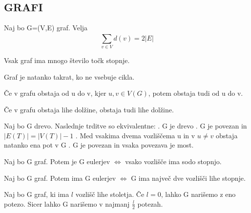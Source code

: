\subsection{GRAFI}
\begin{frame}
    \subsectionpage
\end{frame}

\begin{slajd}
    {}{Naj bo G=(V,E) graf. Velja \[\sum_{v \in V}^{} d(v) = 2|E|\]}
\end{slajd}

\begin{pagin}
Vsak graf ima  mnogo število točk  stopnje.
\end{pagin}

\begin{pagin}
Graf je  natanko takrat, ko ne vsebuje  cikla.
\end{pagin}

\begin{pagin}
Če v grafu obstaja  od u do v, kjer $u,v \in V(G)$, potem obstaja tudi  od u do v.
\end{pagin}

\begin{pagin}
    Če v grafu obstaja  lihe dolžine, obstaja tudi  lihe dolžine.
\end{pagin}

\begin{slajd}
    {}{Naj bo G drevo. Naslednje trditve so ekvivalentne: . G je drevo . G je povezan in $|E(T)| = |V(T)|-1$ . Med vsakima dvema vozliščema u in v $ u \neq v$ obstaja natanko ena pot v G . G je povezan in vsaka povezava je most.}
\end{slajd}

\begin{slajd}
    {}{Naj bo G  graf. Potem je G eulerjev $\Leftrightarrow $ vsako vozlišče ima sodo stopnjo.}
\end{slajd}

\begin{slajd}
    {}{Naj bo G  graf. Potem ima G eulerjev  $\Leftrightarrow $ G ima največ dve vozlišči lihe stopnje.}
\end{slajd}

\begin{slajd}
    {}{Naj bo G  graf, ki ima $l$ vozlišč lihe stoletja. Če $l=0$, lahko G narišemo z eno potezo. Sicer lahko G narišemo v najmanj  $\frac{l}{2}$ potezah.}
\end{slajd}

